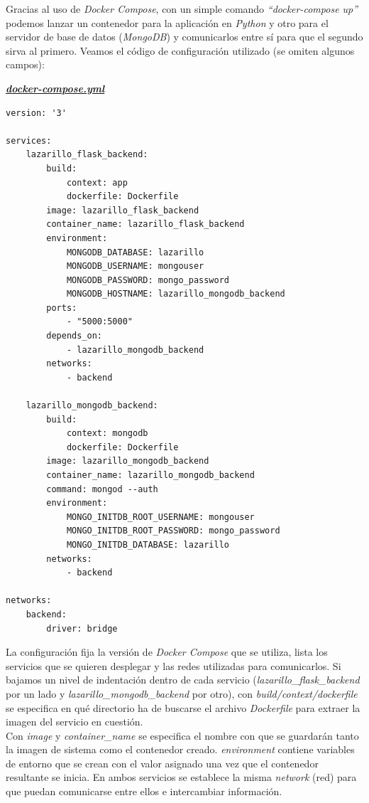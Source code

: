Gracias al uso de \textit{Docker Compose}, con un simple comando \textit{``docker-compose up''} podemos lanzar un contenedor para la aplicación en \textit{Python} y otro para el servidor de base de datos (\textit{MongoDB}) y comunicarlos entre sí para que el segundo sirva al primero. Veamos el código de configuración utilizado (se omiten algunos campos):

\textbf{\textit{\href{https://github.com/adrianmorente/lazarillo-admin-backend/blob/main/docker-compose.yml}{docker-compose.yml}}}
\begin{lstlisting}
version: '3'

services:
	lazarillo_flask_backend:
		build:
			context: app
			dockerfile: Dockerfile
		image: lazarillo_flask_backend
		container_name: lazarillo_flask_backend
		environment:
			MONGODB_DATABASE: lazarillo
			MONGODB_USERNAME: mongouser
			MONGODB_PASSWORD: mongo_password
			MONGODB_HOSTNAME: lazarillo_mongodb_backend
		ports:
			- "5000:5000"
		depends_on:
			- lazarillo_mongodb_backend
		networks:
			- backend

	lazarillo_mongodb_backend:
		build:
			context: mongodb
			dockerfile: Dockerfile
		image: lazarillo_mongodb_backend
		container_name: lazarillo_mongodb_backend
		command: mongod --auth
		environment:
			MONGO_INITDB_ROOT_USERNAME: mongouser
			MONGO_INITDB_ROOT_PASSWORD: mongo_password
			MONGO_INITDB_DATABASE: lazarillo
		networks:
			- backend

networks:
	backend:
		driver: bridge
\end{lstlisting}

La configuración fija la versión de \textit{Docker Compose} que se utiliza, lista los servicios que se quieren desplegar y las redes utilizadas para comunicarlos. Si bajamos un nivel de indentación dentro de cada servicio (\textit{lazarillo\_flask\_backend} por un lado y \textit{lazarillo\_mongodb\_backend} por otro), con \emph{build/context/dockerfile} se especifica en qué directorio ha de buscarse el archivo \textit{Dockerfile} para extraer la imagen del servicio en cuestión.\\

Con \emph{image} y \emph{container\_name} se especifica el nombre con que se guardarán tanto la imagen de sistema como el contenedor creado. \emph{environment} contiene variables de entorno que se crean con el valor asignado una vez que el contenedor resultante se inicia. En ambos servicios se establece la misma \textit{network} (red) para que puedan comunicarse entre ellos e intercambiar información.\\

